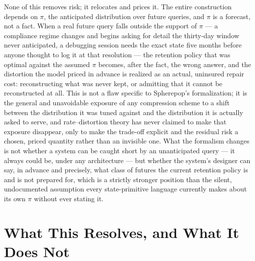 \documentclass[11pt]{article}
\begin{document}
None of this removes risk; it relocates and prices it. The entire construction depends on $\pi$, the anticipated distribution over future queries, and $\pi$ is a forecast, not a fact. When a real future query falls outside the support of $\pi$ --- a compliance regime changes and begins asking for detail the thirty-day window never anticipated, a debugging session needs the exact state five months before anyone thought to log it at that resolution --- the retention policy that was optimal against the assumed $\pi$ becomes, after the fact, the wrong answer, and the distortion the model priced in advance is realized as an actual, uninsured repair cost: reconstructing what was never kept, or admitting that it cannot be reconstructed at all. This is not a flaw specific to Spherepop's formalization; it is the general and unavoidable exposure of any compression scheme to a shift between the distribution it was tuned against and the distribution it is actually asked to serve, and rate--distortion theory has never claimed to make that exposure disappear, only to make the trade-off explicit and the residual risk a chosen, priced quantity rather than an invisible one. What the formalism changes is not whether a system can be caught short by an unanticipated query --- it always could be, under any architecture --- but whether the system's designer can say, in advance and precisely, what class of futures the current retention policy is and is not prepared for, which is a strictly stronger position than the silent, undocumented assumption every state-primitive language currently makes about its own $\pi$ without ever stating it.

\section{What This Resolves, and What It Does Not}
\end{document}
